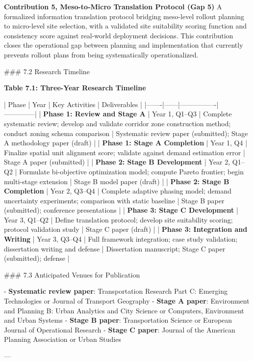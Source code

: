 \documentclass[letterpaper, 12pt, oneside, doublespacing]{Thesis}
\begin{document}
\textbf{Contribution 5, Meso-to-Micro Translation Protocol (Gap 5)}
A formalized information translation protocol bridging meso-level rollout planning to micro-level site selection, with a validated site suitability scoring function and consistency score against real-world deployment decisions. This contribution closes the operational gap between planning and implementation that currently prevents rollout plans from being systematically operationalized.

\#\#\# 7.2 Research Timeline

\textbf{Table 7.1: Three-Year Research Timeline}

| Phase | Year | Key Activities | Deliverables |
|-------|------|----------------|--------------|
| \textbf{Phase 1: Review and Stage A} | Year 1, Q1--Q3 | Complete systematic review; develop and validate corridor zone construction method; conduct zoning schema comparison | Systematic review paper (submitted); Stage A methodology paper (draft) |
| \textbf{Phase 1: Stage A Completion} | Year 1, Q4 | Finalize spatial unit alignment score; validate against demand estimation error | Stage A paper (submitted) |
| \textbf{Phase 2: Stage B Development} | Year 2, Q1--Q2 | Formulate bi-objective optimization model; compute Pareto frontier; begin multi-stage extension | Stage B model paper (draft) |
| \textbf{Phase 2: Stage B Completion} | Year 2, Q3--Q4 | Complete adaptive phasing model; demand uncertainty experiments; comparison with static baseline | Stage B paper (submitted); conference presentations |
| \textbf{Phase 3: Stage C Development} | Year 3, Q1--Q2 | Define translation protocol; develop site suitability scoring; protocol validation study | Stage C paper (draft) |
| \textbf{Phase 3: Integration and Writing} | Year 3, Q3--Q4 | Full framework integration; case study validation; dissertation writing and defense | Dissertation manuscript; Stage C paper (submitted); defense |

\#\#\# 7.3 Anticipated Venues for Publication

- \textbf{Systematic review paper}: Transportation Research Part C: Emerging Technologies or Journal of Transport Geography
- \textbf{Stage A paper}: Environment and Planning B: Urban Analytics and City Science or Computers, Environment and Urban Systems
- \textbf{Stage B paper}: Transportation Science or European Journal of Operational Research
- \textbf{Stage C paper}: Journal of the American Planning Association or Urban Studies


---

\fi %



\nocite{*}


\end{document}
